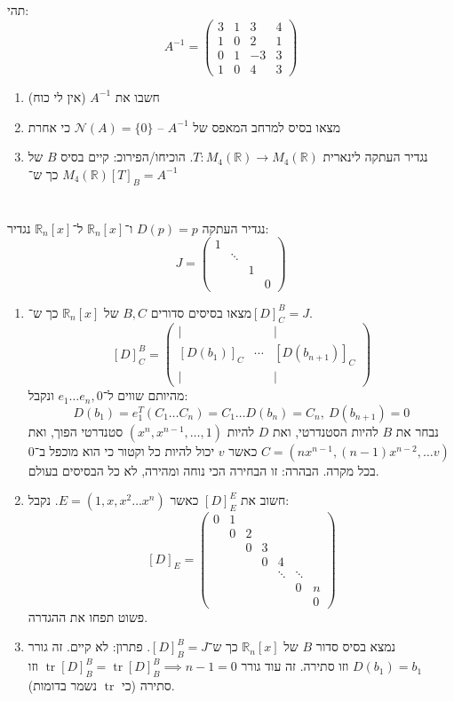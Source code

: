 \documentclass[]{article}
\newcommand\R     {\mathbb{R}}
\newcommand\nc    {\mathcal{N}}
\DeclareMathOperator{\tr}     {tr}
\newcommand\co        {\colon}
\newcommand\pms[1]    {\begin{pmatrix}
		#1
\end{pmatrix}}
\newcommand\op    {^{-1}}
\theoremstyle{definition}
\begin{document}
	\section{}
	תהי: 
	\[ A\op = \pms{3 & 1 & 3 & 4 \\ 1 & 0 & 2 & 1 \\ 0 & 1 & -3 & 3 \\ 1 & 0 & 4 & 3} \]
	\begin{enumerate}
		\item חשבו את $A\op$ (אין לי כוח)
		\item מצאו בסיס למרחב המאפס של $A\op$ – $\nc(A) = \{0\}$ כי אחרת 
		\item נגדיר העתקה לינארית $T \co M_4(\R) \to M_4(\R)$. הוכיחו/הפירוכ: קיים בסיס $B$ של $M_4(\R)$ כך ש־$[T]_B = A\op$
	\end{enumerate}
	
	\section{}
	נגדיר העתקה $D(p) = p$ ו־$\R_n[x]$ ל־$\R_n[x]$ נגדיר: 
	\[ J = \pms{1 \\ & \ddots \\ && 1 \\ &&& 0} \]
	\begin{enumerate}
		\item מצאו בסיסים סדורים $B, C$ של $\R_n[x]$ כך ש־$[D]^{B}_C = J$. 
		\[ [D]^{B}_C = \pms{\vert & & \vert \\ [D(b_1)]_C & \cdots & [D(b_{n + 1})]_C \\ \vert & & \vert} \]
		מהיותם שווים ל־$e_1 \dots e_n, 0$ ונקבל: 
		\[ D(b_1) = e_1^T(C_1 \dots C_n) = C_1 \dots D(b_n) = C_n, \ D(b_{n + 1}) = 0  \]
		נבחר את $B$ להיות הסטנדרטי, ואת $D$ להיות $(x^n, x^{n - 1}, \dots, 1)$ סטנדרטי הפוך, ואת $C = (nx^{n - 1}, (n - 1)x^{n - 2}, \dots v)$ כאשר $v$ יכול להיות כל וקטור כי הוא מוכפל ב־$0$ בכל מקרה. הבהרה: זו הבחירה הכי נוחה ומהירה, לא כל הבסיסים בעולם. 
		\item חשוב את $[D]^{E}_E$ כאשר $E = (1, x, x^{2} \dots x^{n})$. נקבל:
		\[ [D]_E = \pms{0 & 1 \\ & 0 & 2 \\  && 0& 3 \\ &&& 0 & 4 \\ &&&& \ddots & \ddots \\ &&&&& 0 & n \\ &&&&&& 0} \]
		פשוט תפחו את ההגדרה. 
		\item נמצא בסיס סדור $B$ של $\R_n[x]$ כך ש־$[D]^B_B = J$. פתרון: לא קיים. זה גורר $D(b_1) = b_1$ וזו סתירה. זה עוד גורר $\tr [D]^{B}_B = \tr [D]^{B}_B \implies n - 1 = 0$ וזו סתירה (כי $\tr$ נשמר בדומות). 
	\end{enumerate}
	
\end{document}
